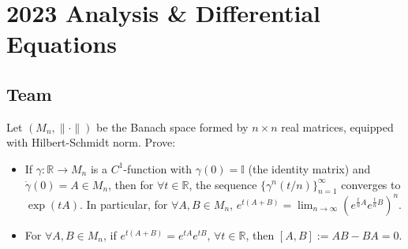 \section{2023 Analysis \& Differential Equations}

\subsection{Team}

\begin{exercise}
\label{analysis:2023:1}
Let $(M_n,\|\cdot\|)$ be the Banach space formed by $n\times n$ real matrices, equipped with Hilbert-Schmidt norm. Prove:

\begin{itemize}
\item[(1)] If $\gamma:\mathbb{R}\to M_n$ is a $C^1$-function with $\gamma(0)=\mathbb{I}$ (the identity matrix) and $\dot{\gamma}(0)=A\in M_n$, then for $\forall t\in\mathbb{R}$, the sequence $\{\gamma^n(t/n)\}_{n=1}^{\infty}$ converges to $\exp(tA)$. In particular, for $\forall A,B\in M_n$, $e^{t(A+B)} = \lim_{n\to\infty}(e^{\frac{t}{n}A}e^{\frac{t}{n}B})^n$.
\item[(2)] For $\forall A,B\in M_n$, if $e^{t(A+B)} = e^{tA}e^{tB}$, $\forall t\in\mathbb{R}$, then $[A,B]:=AB-BA=0$.
\end{itemize}
\end{exercise}

